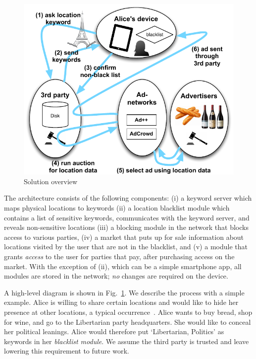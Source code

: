 \begin{figure}
  \begin{center}
    \includegraphics[width=0.9\linewidth]{fig/keyword/TLPOverview.pdf}
  \end{center}
  \caption{Solution overview}
  \label{fig:overview}
\end{figure}
The architecture consists of the following components: 
(i) a keyword server which maps physical locations to keywords
(ii) a location blacklist module which contains a list of sensitive keywords, 
communicates with the keyword server, and reveals non-sensitive locations
(iii) a blocking module in the network that blocks access to various parties, 
(iv) a market that puts up for sale information about locations visited by the user that are not in the blacklist, 
and (v) a module that grants \emph{access}
to the user for parties that pay, after purchasing access on the market.
With the exception of (ii), which can be a simple smartphone app, all modules are stored in the network; \emph{no} changes are required on the device.

A high-level diagram is shown in Fig.~\ref{fig:overview}. 
We describe the process with a simple example. 
Alice is willing to share certain locations and would like to hide her presence at other locations, a typical occurrence~\cite{Kelley:2011}. 
Alice wants to buy bread, shop for wine, and go to the Libertarian party headquarters. 
She would like to conceal her political leanings.
Alice would therefore put `Libertarian, Politics' as keywords in her \emph{blacklist module}. 
We assume the third party is trusted and leave lowering this requirement to future work.


